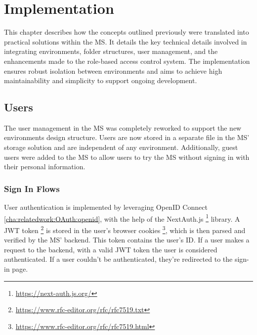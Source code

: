 \chapter{Implementation}
\label{cha:implementation}

This chapter describes how the concepts outlined previously were translated into practical solutions within the MS.
It details the key technical details involved in integrating environments,
folder structures,
user management,
and the enhancements made to the role-based access control system.
The implementation ensures robust isolation between environments and 
aims to achieve high maintainability and simplicity to support ongoing development.


\section{Users}

The user management in the MS was completely reworked to support the new 
environments design structure.
Users are now stored in a separate file in the MS' storage solution and are independent of
any environment.
Additionally, guest users were added to the MS to allow users to try the MS without
signing in with their personal information.

%

\subsection{Sign In Flows}

User authentication is implemented by leveraging OpenID Connect \ref{cha:relatedwork:OAuth:openid},
with the help of the NextAuth.js \footnote{\url{https://next-auth.js.org/}} library.
A JWT token \footnote{\url{https://www.rfc-editor.org/rfc/rfc7519.txt}}
is stored in the user's browser cookies \footnote{\url{https://www.rfc-editor.org/rfc/rfc7519.html}},
which is then parsed and verified by the MS' backend.
This token contains the user's ID.
If a user makes a request to the backend,
with a valid JWT token the user is considered authenticated.
If a user couldn't be authenticated, they're redirected to the sign-in page.

